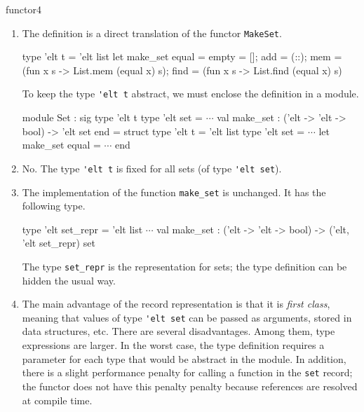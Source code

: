 \begin{exercise}{functor4}
\begin{answer}\ifanswers
\begin{enumerate}
\item

The definition is a direct translation of the
functor \hbox{\lstinline$MakeSet$}.

\begin{ocaml}
type 'elt t = 'elt list
let make_set equal =
   { empty = [];
     add = (::);
     mem = (fun x s -> List.mem (equal x) s);
     find = (fun x s -> List.find (equal x) s)
   }
\end{ocaml}
%
To keep the type \hbox{\lstinline$'elt t$} abstract, we must enclose the
definition in a module.

\begin{ocaml}
module Set : sig
   type 'elt t
   type 'elt set = $\cdots$
   val make_set : ('elt -> 'elt -> bool) -> 'elt set
end = struct
   type 'elt t = 'elt list
   type 'elt set = $\cdots$
   let make_set equal = $\cdots$
end
\end{ocaml}

\item

No.  The type \hbox{\lstinline$'elt t$} is fixed for all sets (of
type \hbox{\lstinline$'elt set$}).

\item

The implementation of the function \hbox{\lstinline$make_set$} is
unchanged.  It has the following type.

\begin{ocaml}
type 'elt set_repr = 'elt list
$\cdots$
val make_set : ('elt -> 'elt -> bool) -> ('elt, 'elt set_repr) set
\end{ocaml}
%
The type \hbox{\lstinline$set_repr$} is the representation for sets; the type
definition can be hidden the usual way.

\item

The main advantage of the record representation is that it
is \emph{first class}, meaning that values of
type \hbox{\lstinline$'elt set$} can be passed as arguments, stored in
data structures, etc.  There are several disadvantages.  Among them,
type expressions are larger.  In the worst case, the type definition
requires a parameter for each type that would be abstract in the
module.  In addition, there is a slight performance penalty for
calling a function in the \hbox{\lstinline$set$} record; the functor
does not have this penalty penalty because references are resolved at
compile time.

\end{enumerate}
\fi\end{answer}
\end{exercise}

